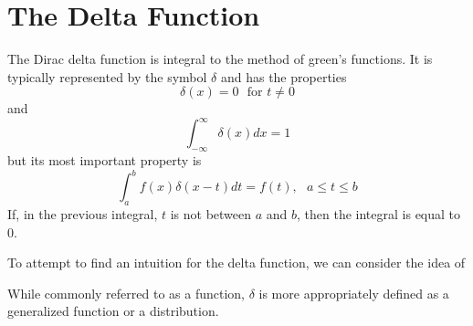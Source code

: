 \section{The Delta Function}
The Dirac delta function is integral to the method of green's functions. It is typically represented by the symbol \(\delta\) and has the properties
\begin{equation}
    \delta(x) = 0~~~ \text{for } t\neq0
\end{equation}
and
\begin{equation}
    \int_{-\infty}^{\infty} \delta(x) dx = 1
\end{equation}
but its most important property is 
\begin{equation}
    \int_a^b f(x)\delta(x-t) dt= f(t), ~~~ a\leq t \leq b
\end{equation}
If, in the previous integral, \(t\) is not between \(a\) and \(b\), then the integral is equal to 0. 

To attempt to find an intuition for the delta function, we can consider the idea of 

While commonly referred to as a function, \(\delta\) is more appropriately defined as a generalized function or a distribution. 